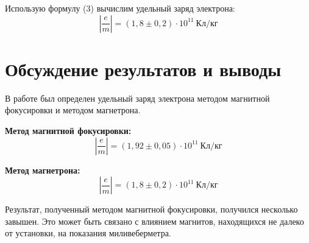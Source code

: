 Использую формулу (3) вычислим удельный заряд электрона:
\[
    \left| \frac{e}{m}\right| = (1,8 \pm 0,2) \cdot 10^{11}\ \text{Кл/кг}
\] 
\section{Обсуждение результатов и выводы}
В работе был определен удельный заряд электрона методом магнитной фокусировки и методом
магнетрона.

\textbf{Метод магнитной фокусировки:}
\[
    \left|\frac{e}{m} \right| = (1,92\pm 0,05) \cdot 10^{11}\ \text{Кл/кг} 
\] 

\textbf{Метод магнетрона:}
\[
    \left|\frac{e}{m} \right| = (1,8\pm 0,2) \cdot 10^{11}\ \text{Кл/кг}
\] 

Результат, полученный методом магнитной фокусировки, получился несколько завышен. Это может быть связано с
влиянием магнитов, находящихся не далеко от установки, на показания миливеберметра.


